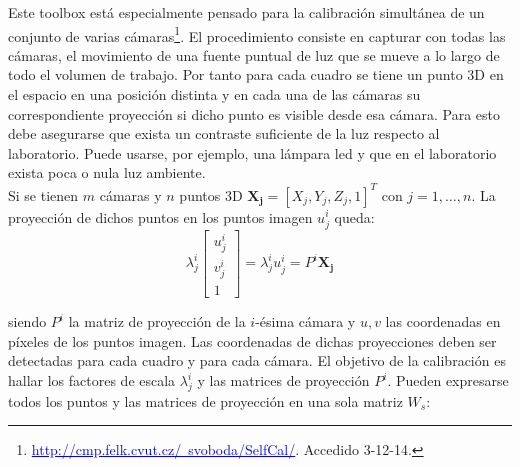  Este toolbox está especialmente pensado para la calibración simultánea de un conjunto de varias cámaras\footnote{\textcolor{blue}{\underline{http://cmp.felk.cvut.cz/~svoboda/SelfCal/}}. Accedido 3-12-14.}. El procedimiento consiste en capturar con todas las cámaras, el movimiento de una fuente puntual de luz que se mueve a lo largo de todo el volumen de trabajo. Por tanto para cada cuadro se tiene un punto 3D en el espacio en una posición distinta y en cada una de las cámaras su correspondiente proyección si dicho punto es visible desde esa cámara. Para esto debe asegurarse que exista un contraste suficiente de la luz respecto al laboratorio. Puede usarse, por ejemplo, una lámpara led y que en el laboratorio exista poca o nula luz ambiente.\\
 
 
 Si se tienen $m$ cámaras y $n$ puntos 3D  
$\mathbf{X_j} = [X_j, Y_j, Z_j,1]^T$ con $j=1,\ldots,n$. La proyección de dichos puntos en los puntos imagen $u_j^i$ queda:
\[ \lambda_j^i
\begin{bmatrix}
u_j^i \\
v_j^i \\
1
\end{bmatrix} 
 = \lambda_j^i u_j^i = P^i \mathbf{X_j}
\]

siendo $P^i$ la matriz de proyección de la $i$-ésima cámara y $u,v$ las coordenadas en píxeles de los puntos imagen. Las coordenadas de dichas proyecciones deben ser detectadas para cada cuadro y para cada cámara. El objetivo de la calibración es hallar los factores de escala $\lambda_j^i$ y las matrices de proyección $P^i$. Pueden expresarse todos los puntos y las matrices de proyección en una sola matriz $W_s$:

